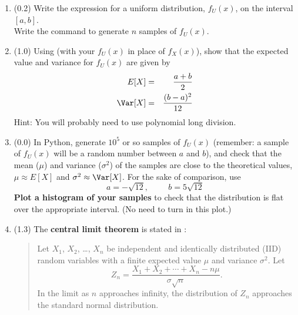 \documentclass[11pt,titlepage,fleqn]{article}
\begin{document}
\begin{enumerate}
\item (0.2) Write the expression for a uniform distribution, $f_U(x)$, on the interval $[a,b]$. \\
Write the command to generate $n$ samples of $f_U(x)$.
\label{fu}


\item (1.0) Using  (with your $f_U(x)$ in place of $f_X(x)$), show that the expected value and variance for $f_U(x)$ are given by
%
\begin{eqnarray}
E[X] &=& \frac{a+b}{2}
\\
\Var[X] &=& \frac{(b-a)^2}{12}
\end{eqnarray}
%
Hint: You will probably need to use polynomial long division.


\item (0.0) In Python, generate $10^5$ or so samples of $f_U(x)$ (remember: a sample of $f_U(x)$ will be a random number between $a$ and $b$), and check that the mean ($\mu$) and variance ($\sigma^2$) of the samples are close to the theoretical values, \ie $\mu \approx E[X]$ and $\sigma^2 \approx \Var[X]$. For the sake of comparison, use
%
\begin{equation*}
a = -\sqrt{12},
\hspace{1cm}
b = 5\sqrt{12}
\end{equation*}
%
{\bf Plot a histogram of your samples} to check that the distribution is flat over the appropriate interval. (No need to turn in this plot.)


\item (1.3) The {\bf central limit theorem} is stated in \citet[][Section B.6]{Aster}:
%
\begin{quote}
Let $X_1$, $X_2$, \ldots, $X_n$ be independent and identically distributed (IID) random variables with a finite expected value $\mu$ and variance $\sigma^2$. Let
%
\begin{equation}
Z_n = \frac{X_1 + X_2 + \cdots + X_n - n\mu}{\sigma\sqrt{n}}.
\label{Zn}
\end{equation}
%
In the limit as $n$ approaches infinity, the distribution of $Z_n$ approaches the standard normal distribution.
\end{quote}


\end{enumerate}
\end{document}
